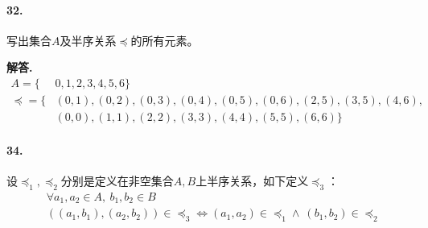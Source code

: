 \documentclass[12pt, a4paper, oneside]{ctexart}
\newenvironment{solution}{\par\noindent\textbf{解答. }}{\bigskip\par}
\begin{document}
\paragraph{32.}写出集合$A$及半序关系$\preccurlyeq$的所有元素。
\begin{solution}
    \begin{equation*}
        \begin{aligned}
            A=\{&0,1,2,3,4,5,6\}\\
            \preccurlyeq=\{&(0,1),(0,2),(0,3),(0,4),(0,5),(0,6),(2,5),(3,5),(4,6),\\
            &(0,0),(1,1),(2,2),(3,3),(4,4),(5,5),(6,6)\}
        \end{aligned}
    \end{equation*}
\end{solution}
\paragraph{34.}设$\preccurlyeq_1, \preccurlyeq_2$分别是定义在非空集合$A, B$上半序关系，如下定义$\preccurlyeq_3$：
    \begin{equation*}
        \begin{aligned}
            &\forall a_1,a_2\in A,\ b_1, b_2\in B\\
            &((a_1,b_1),(a_2,b_2))\in\preccurlyeq_3\iff (a_1,a_2)\in\preccurlyeq_1\wedge\ (b_1,b_2)\in\preccurlyeq_2
        \end{aligned}
    \end{equation*}
\end{document}
